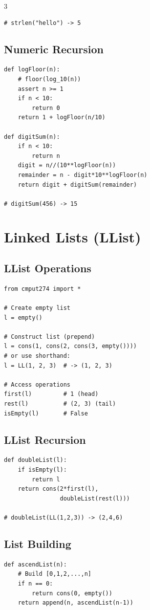 \documentclass[8pt,landscape,a4paper]{article}
\begin{document}
\begin{multicols}{3}
\begin{lstlisting}
# strlen("hello") -> 5
\end{lstlisting}

\subsection*{Numeric Recursion}
\begin{lstlisting}
def logFloor(n):
    # floor(log_10(n))
    assert n >= 1
    if n < 10:
        return 0
    return 1 + logFloor(n/10)

def digitSum(n):
    if n < 10:
        return n
    digit = n//(10**logFloor(n))
    remainder = n - digit*10**logFloor(n)
    return digit + digitSum(remainder)

# digitSum(456) -> 15
\end{lstlisting}

\section*{Linked Lists (LList)}

\subsection*{LList Operations}
\begin{lstlisting}
from cmput274 import *

# Create empty list
l = empty()

# Construct list (prepend)
l = cons(1, cons(2, cons(3, empty())))
# or use shorthand:
l = LL(1, 2, 3)  # -> (1, 2, 3)

# Access operations
first(l)         # 1 (head)
rest(l)          # (2, 3) (tail)
isEmpty(l)       # False
\end{lstlisting}

\subsection*{LList Recursion}
\begin{lstlisting}
def doubleList(l):
    if isEmpty(l):
        return l
    return cons(2*first(l), 
                doubleList(rest(l)))

# doubleList(LL(1,2,3)) -> (2,4,6)
\end{lstlisting}

\subsection*{List Building}
\begin{lstlisting}
def ascendList(n):
    # Build [0,1,2,...,n]
    if n == 0:
        return cons(0, empty())
    return append(n, ascendList(n-1))


\end{lstlisting}
\end{multicols}
\end{document}
